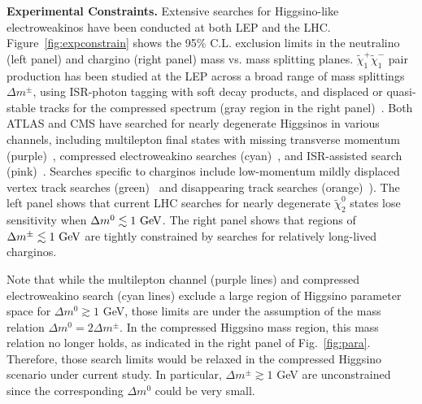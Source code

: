 \documentclass[
    twocolumn,
    superscriptaddress,
    amsmath, 
    amssymb,
    aps,
    reprint,
    floatfix
]{revtex4-2}
\begin{document}
\vspace{0.5em}\noindent
\textbf{Experimental Constraints.}
\label{sec:exp}
% 
Extensive searches for Higgsino-like electroweakinos have been conducted at both LEP and the LHC. Figure~\ref{fig:expconstrain} shows the 95\% C.L. exclusion limits in the neutralino (left panel) and chargino (right panel) mass vs. mass splitting planes.
$\tilde{\chi}^+_1\tilde{\chi}^-_1$ pair production has been studied at the LEP across a broad range of mass splittings $\Delta m^\pm$, using ISR-photon tagging with soft decay products, and displaced or quasi-stable tracks for the compressed spectrum (gray region in the right panel)~\cite{Abdallah:2002aik,DELPHI:1999jsl,ALEPH:2002gap,L3:1999twz,DELPHI:1997tcq}.
Both ATLAS and CMS have searched for nearly degenerate Higgsinos in various channels, including multilepton final states with missing transverse momentum (purple)~\cite{ATLAS:2021moa, ATLAS:2019lng, CMS:2021edw}, 
compressed electroweakino searches (cyan)~\cite{CMS-PAS-EXO-23-017}, and ISR-assisted search (pink)~\cite{ATLAS:2024woy}. 
Searches specific to charginos include low-momentum mildly displaced vertex track searches (green)~\cite{ATLAS:2024umc, CMS:2025twk} and disappearing track searches (orange)~\cite{ATLAS:2022rme, CMS:2023mny}). The left panel shows that current LHC searches for nearly degenerate $\tilde{\chi}^0_2$ states lose sensitivity when $\Delta m^0 \lesssim 1~\rm{GeV}$.  The right panel shows that regions of $\Delta m^\pm \lesssim 1~\rm{GeV}$ are tightly constrained by searches for relatively long-lived charginos.


Note that while the multilepton channel (purple lines) and compressed electroweakino search (cyan lines) exclude a large region of Higgsino parameter space for $\Delta m^0 \gtrsim 1$ GeV, those limits are under the assumption of the mass relation $\Delta m^0 = 2 \Delta m^\pm$. In the compressed Higgsino mass region, this mass relation no longer holds, as indicated in the right panel of Fig.~\ref{fig:para}. Therefore, those search limits would be relaxed in the compressed Higgsino scenario under current study. In particular,  $\Delta m^\pm \gtrsim 1$ GeV are unconstrained since the corresponding $\Delta m^0$ could be very small.



\end{document}
